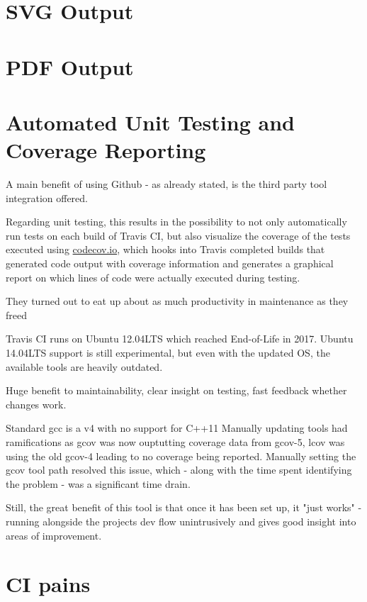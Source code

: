 \section{SVG Output}
\label{sec:svg}

\section{PDF Output}
\label{sec:pdf}


\section{Automated Unit Testing and Coverage Reporting}
A main benefit of using Github - as already stated, is the third party tool integration offered.

Regarding unit testing, this results in the possibility to not only automatically run tests on each build of Travis CI, but also visualize the \gls{coverage} of the tests executed using \url{codecov.io}, which hooks into Travis completed builds that generated code output with coverage information and generates a graphical report on which lines of code were actually executed during testing.

They turned out to eat up about as much productivity in maintenance as they freed

Travis CI runs on Ubuntu 12.04LTS which reached End-of-Life in 2017. Ubuntu 14.04LTS support is still experimental, but even with the updated OS, the available tools are heavily outdated.

Huge benefit to maintainability, clear insight on testing, fast feedback whether changes work.

Standard gcc is a v4 with no support for C++11
Manually updating tools had ramifications as gcov was now ouptutting coverage data from gcov-5, lcov was using the old gcov-4 leading to no coverage being reported. Manually setting the gcov tool path resolved this issue, which - along with the time spent identifying the problem - was a significant time drain.

Still, the great benefit of this tool is that once it has been set up, it "just works" - running alongside the projects dev flow unintrusively and gives good insight into areas of improvement.

\section{CI pains}




